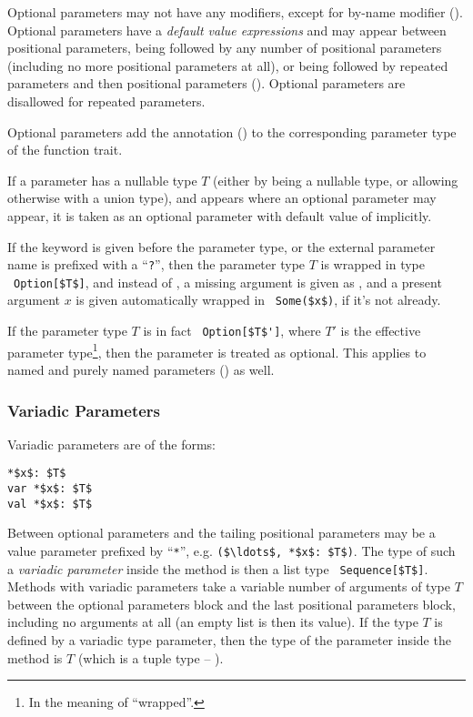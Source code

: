 Optional parameters may not have any modifiers, except for by-name modifier (). Optional parameters have a {\em default value expressions} and may appear between positional parameters, being followed by any number of positional parameters (including no more positional parameters at all), or being followed by repeated parameters and then positional parameters (). Optional parameters are disallowed for repeated parameters. 

Optional parameters add the annotation ()  to the corresponding parameter type of the function trait. 

If a parameter has a nullable type $T$ (either by being a nullable type, or allowing otherwise  with a union type), and appears where an optional parameter may appear, it is taken as an optional parameter with default value of  implicitly. 

If the keyword  is given before the parameter type, or the external parameter name is prefixed with a ``\lstinline!?!'', then the parameter type $T$ is wrapped in type ~\lstinline!Option[$T$]!, and instead of , a missing argument is given as , and a present argument $x$ is given automatically wrapped in ~\lstinline!Some($x$)!, if it's not already.

If the parameter type $T$ is in fact ~\lstinline!Option[$T$']!, where $T'$ is the effective parameter type\footnote{In the meaning of ``wrapped''.}, then the parameter is treated as optional. This applies to named and purely named parameters () as well. 





\subsubsection{Variadic Parameters}
\label{sec:variadic-parameters}

Variadic parameters are of the forms:
\begin{lstlisting}
*$x$: $T$
var *$x$: $T$
val *$x$: $T$
\end{lstlisting}

Between optional parameters and the tailing positional parameters may be a value parameter prefixed by ``\lstinline!*!'', e.g. \lstinline!($\ldots$, *$x$: $T$)!. The type of such a {\em variadic parameter} inside the method is then a list type ~\lstinline!Sequence[$T$]!. Methods with variadic parameters take a variable number of arguments of type $T$ between the optional parameters block and the last positional parameters block, including no arguments at all (an empty list is then its value). If the type $T$ is defined by a variadic type parameter, then the type of the parameter inside the method is $T$ (which is a tuple type -- ). 

